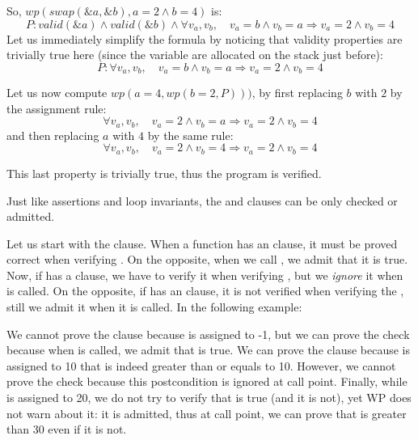 So, $wp(swap(\&a, \&b), a = 2 \wedge b = 4)$ is:
$$P: valid(\&a) \wedge valid(\&b) \wedge \forall v_a, v_b, \quad v_a = b \wedge v_b = a \Rightarrow v_a = 2 \wedge v_b = 4$$
Let us immediately simplify the formula by noticing that validity properties
are trivially true here (since the variable are allocated on the stack just
before):
$$P: \forall v_a, v_b, \quad v_a = b \wedge v_b = a \Rightarrow v_a = 2 \wedge v_b = 4$$


Let us now compute $wp(a = 4, wp(b = 2, P)))$, by first replacing $b$ with
$2$ by the assignment rule:
$$\forall v_a, v_b, \quad v_a = 2 \wedge v_b = a \Rightarrow v_a = 2 \wedge v_b = 4$$
and then replacing $a$ with $4$ by the same rule:
$$\forall v_a, v_b, \quad v_a = 2 \wedge v_b = 4 \Rightarrow v_a = 2 \wedge v_b = 4$$


This last property is trivially true, thus the program is verified.




Just like assertions and loop invariants, the  and
 clauses can be only checked or admitted.


Let us start with the  clause. When a function
 has an  clause, it must be proved correct
when verifying . On the opposite, when we call , we
admit that it is true. Now, if  has a 
clause, we have to verify it when verifying , but we
\textit{ignore} it when  is called. On the opposite, if
 has an  clause, it is not verified when
verifying the , still we admit it when it is called. In the
following example:



We cannot prove the clause  because  is assigned
to -1, but we can prove the check  because when  is
called, we admit that  is true. We can prove the clause
 because  is assigned to 10 that is indeed greater
than or equals to 10. However, we cannot prove the check  because
this postcondition is ignored at call point. Finally, while  is
assigned to 20, we do not try to verify that  is true (and it is
not), yet WP does not warn about it: it is admitted, thus at call point, we can
prove that  is greater than 30 even if it is not.

